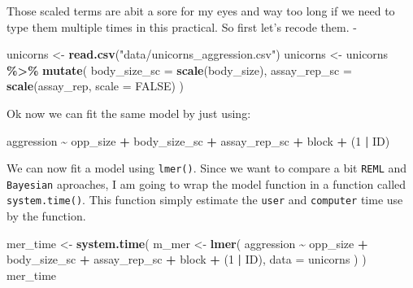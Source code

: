 \documentclass[
  12pt,
]{book}
\newenvironment{Shaded}{\begin{snugshade}}{\end{snugshade}}
\newcommand{\DataTypeTok}[1]{\textcolor[rgb]{0.13,0.29,0.53}{#1}}
\newcommand{\DecValTok}[1]{\textcolor[rgb]{0.00,0.00,0.81}{#1}}
\newcommand{\KeywordTok}[1]{\textcolor[rgb]{0.13,0.29,0.53}{\textbf{#1}}}
\newcommand{\NormalTok}[1]{#1}
\newcommand{\OperatorTok}[1]{\textcolor[rgb]{0.81,0.36,0.00}{\textbf{#1}}}
\newcommand{\OtherTok}[1]{\textcolor[rgb]{0.56,0.35,0.01}{#1}}
\newcommand{\StringTok}[1]{\textcolor[rgb]{0.31,0.60,0.02}{#1}}
\begin{document}
Those scaled terms are abit a sore for my eyes and way too long if we need to type them multiple times in this practical.
So first let's recode them.
-

\begin{Shaded}
\begin{Highlighting}[]
\NormalTok{unicorns \textless{}{-}}\StringTok{ }\KeywordTok{read.csv}\NormalTok{(}\StringTok{"data/unicorns\_aggression.csv"}\NormalTok{)}
\NormalTok{unicorns \textless{}{-}}\StringTok{ }\NormalTok{unicorns }\OperatorTok{\%\textgreater{}\%}
\StringTok{  }\KeywordTok{mutate}\NormalTok{(}
    \DataTypeTok{body\_size\_sc =} \KeywordTok{scale}\NormalTok{(body\_size),}
    \DataTypeTok{assay\_rep\_sc =} \KeywordTok{scale}\NormalTok{(assay\_rep, }\DataTypeTok{scale =} \OtherTok{FALSE}\NormalTok{)}
\NormalTok{  )}
\end{Highlighting}
\end{Shaded}

Ok now we can fit the same model by just using:

\begin{Shaded}
\begin{Highlighting}[]
\NormalTok{aggression }\OperatorTok{\textasciitilde{}}\StringTok{ }\NormalTok{opp\_size }\OperatorTok{+}\StringTok{ }\NormalTok{body\_size\_sc }\OperatorTok{+}\StringTok{ }\NormalTok{assay\_rep\_sc }\OperatorTok{+}\StringTok{ }\NormalTok{block}
              \OperatorTok{+}\StringTok{ }\NormalTok{(}\DecValTok{1} \OperatorTok{|}\StringTok{ }\NormalTok{ID)}
\end{Highlighting}
\end{Shaded}

We can now fit a model using \texttt{lmer()}. Since we want to compare a bit \texttt{REML} and \texttt{Bayesian} aproaches, I am going to wrap the model function in a function called \texttt{system.time()}.
This function simply estimate the \texttt{user} and \texttt{computer} time use by the function.

\begin{Shaded}
\begin{Highlighting}[]
\NormalTok{mer\_time \textless{}{-}}\StringTok{ }\KeywordTok{system.time}\NormalTok{(}
\NormalTok{  m\_mer \textless{}{-}}\StringTok{ }\KeywordTok{lmer}\NormalTok{(}
\NormalTok{    aggression }\OperatorTok{\textasciitilde{}}\StringTok{ }\NormalTok{opp\_size }\OperatorTok{+}\StringTok{ }\NormalTok{body\_size\_sc }\OperatorTok{+}\StringTok{ }\NormalTok{assay\_rep\_sc }\OperatorTok{+}\StringTok{ }\NormalTok{block}
      \OperatorTok{+}\StringTok{ }\NormalTok{(}\DecValTok{1} \OperatorTok{|}\StringTok{ }\NormalTok{ID),}
    \DataTypeTok{data =}\NormalTok{ unicorns}
\NormalTok{  )}
\NormalTok{)}
\NormalTok{mer\_time}
\end{Highlighting}
\end{Shaded}
\end{document}
